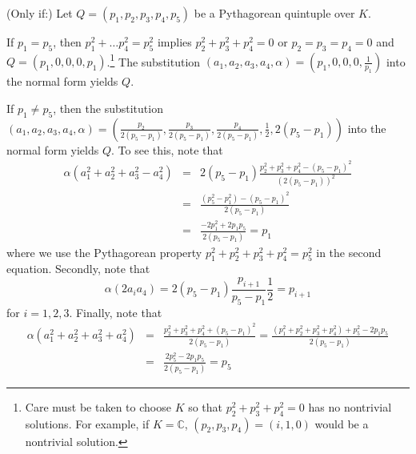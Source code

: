 \documentclass[12pt]{article}
\begin{document}
(Only if:) 
Let $Q = (p_1,p_2,p_3,p_4,p_5)$ be a Pythagorean quintuple over $K$.

If $p_1 = p_5$, then $p_1^2 + \ldots p_4^2 = p_5^2$ 
implies $p_2^2 + p_3^2 + p_4^2 = 0$ or $p_2=p_3=p_4=0$
and $Q = (p_1,0,0,0,p_1)$.\footnote{Care must be taken 
  to choose $K$ so that $p_2^2 + p_3^2 + p_4^2 = 0$ has no nontrivial solutions.
  For example, if $K = \mathbb{C}$, $(p_2,p_3,p_4)=(i,1,0)$ 
  would be a nontrivial solution.}
The substitution $(a_1,a_2,a_3,a_4,\alpha) = (p_1,0,0,0,\frac{1}{p_1})$ into the
normal form yields $Q$.

If $p_1 \neq p_5$, then the substitution 
$(a_1,a_2,a_3,a_4,\alpha) = 
 (\frac{p_2}{2(p_5-p_1)},
  \frac{p_3}{2(p_5-p_1)},
  \frac{p_4}{2(p_5-p_1)},
  \frac{1}{2}, 2(p_5-p_1))$ into the normal form yields $Q$.
To see this, note that
\begin{eqnarray*}
  \alpha(a_1^2 + a_2^2 + a_3^2 - a_4^2)
& = & 2(p_5-p_1) \frac{p_2^2 + p_3^2 + p_4^2 - (p_5 - p_1)^2}{(2(p_5-p_1))^2} \\
& = & \frac{(p_5^2 - p_1^2) - (p_5 - p_1)^2}{2(p_5 - p_1)} \\
& = & \frac{-2p_1^2 + 2p_1p_5}{2(p_5 - p_1)} = p_1
\end{eqnarray*}
where we use the Pythagorean property $p_1^2 + p_2^2 + p_3^2 + p_4^2 = p_5^2$
in the second equation.
Secondly, note that
\[
\alpha (2a_i a_4) = 2(p_5-p_1)\frac{p_{i+1}}{p_5-p_1}\frac{1}{2}
= p_{i+1}
\]
for $i=1,2,3$.
Finally, note that 
\begin{eqnarray*}
\alpha(a_1^2 + a_2^2 + a_3^2 + a_4^2)
& = & \frac{p_2^2 + p_3^2 + p_4^2 + (p_5 - p_1)^2}{2(p_5-p_1)} 
= \frac{(p_1^2 + p_2^2 + p_3^2 + p_4^2) + p_5^2 -2p_1p_5}{2(p_5-p_1)} \\
& = & \frac{2p_5^2 - 2p_1p_5}{2(p_5-p_1)} 
= p_5
\end{eqnarray*}
\QED
\end{document}

